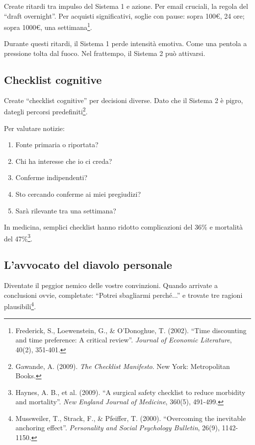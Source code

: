 Create ritardi tra impulso del Sistema 1 e azione. Per email cruciali, la regola del ``draft overnight''. Per acquisti significativi, soglie con pause: sopra 100€, 24 ore; sopra 1000€, una settimana\footnote{Frederick, S., Loewenstein, G., \& O'Donoghue, T. (2002). ``Time discounting and time preference: A critical review''. \textit{Journal of Economic Literature}, 40(2), 351-401.}.

Durante questi ritardi, il Sistema 1 perde intensità emotiva. Come una pentola a pressione tolta dal fuoco. Nel frattempo, il Sistema 2 può attivarsi.

\subsection{Checklist cognitive}

Create ``checklist cognitive'' per decisioni diverse. Dato che il Sistema 2 è pigro, dategli percorsi predefiniti\footnote{Gawande, A. (2009). \textit{The Checklist Manifesto}. New York: Metropolitan Books.}.

Per valutare notizie:
\begin{enumerate}
\item Fonte primaria o riportata?
\item Chi ha interesse che io ci creda?
\item Conferme indipendenti?
\item Sto cercando conferme ai miei pregiudizi?
\item Sarà rilevante tra una settimana?
\end{enumerate}

In medicina, semplici checklist hanno ridotto complicazioni del 36\% e mortalità del 47\%\footnote{Haynes, A. B., et al. (2009). ``A surgical safety checklist to reduce morbidity and mortality''. \textit{New England Journal of Medicine}, 360(5), 491-499.}.

\subsection{L'avvocato del diavolo personale}

Diventate il peggior nemico delle vostre convinzioni. Quando arrivate a conclusioni ovvie, completate: ``Potrei sbagliarmi perché...'' e trovate tre ragioni plausibili\footnote{Mussweiler, T., Strack, F., \& Pfeiffer, T. (2000). ``Overcoming the inevitable anchoring effect''. \textit{Personality and Social Psychology Bulletin}, 26(9), 1142-1150.}.

